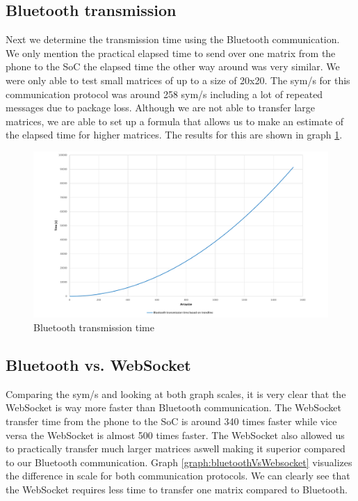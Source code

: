 \documentclass[a4paper, 11pt]{report}
\begin{document}
\subsection{Bluetooth transmission}
Next we determine the transmission time using the Bluetooth communication. We only mention the practical elapsed time to send over one matrix from the phone to the SoC the elapsed time the other way around was very similar. We were only able to test small matrices of up to a size of 20x20. The sym/s for this communication protocol was around 258 sym/s including a lot of repeated messages due to package loss. Although we are not able to transfer large matrices, we are able to set up a formula that allows us to make an estimate of the elapsed time for higher matrices. The results for this are shown in graph \ref{graph:bluetoothTime}.

\begin{figure}[ht]
\centering
\includegraphics[scale=0.45]{images/BluetoothtransmissionSpeed.pdf}
\caption{Bluetooth transmission time}\label{graph:bluetoothTime}
\end{figure}

\subsection{Bluetooth vs. WebSocket}
Comparing the sym/s and looking at both graph scales, it is very clear that the WebSocket is way more faster than Bluetooth communication. The WebSocket transfer time from the phone to the SoC is around 340 times faster while vice versa the WebSocket is almost 500 times faster. The WebSocket also allowed us to practically transfer much larger matrices aswell making it superior compared to our Bluetooth communication. Graph \ref{graph:bluetoothVsWebsocket} visualizes the difference in scale for both communication protocols. We can clearly see that the WebSocket requires less time to transfer one matrix compared to Bluetooth.
\end{document}
